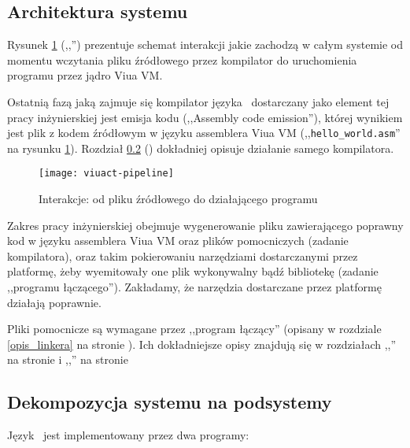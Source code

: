 \subsection{Architektura systemu}
\label{lang_architektura_systemu}

Rysunek \ref{schemat_interakcji_viuact_z_viuavm} (,,'') prezentuje
schemat interakcji jakie zachodzą w całym systemie od momentu wczytania pliku źródłowego przez kompilator do
uruchomienia programu przez jądro Viua VM.

Ostatnią fazą jaką zajmuje się kompilator języka \ViuAct\ dostarczany jako element tej pracy inżynierskiej jest
emisja kodu (,,Assembly code emission''), której wynikiem jest plik z kodem źródłowym w języku assemblera Viua
VM (,,\texttt{hello\_world.asm}'' na rysunku \ref{schemat_interakcji_viuact_z_viuavm}).
Rozdział \ref{architektura_kompilatora_viuact} () dokładniej opisuje
działanie samego kompilatora.

\begin{figure}[!htp]
    \centering
    \texttt{[image: viuact-pipeline]}
    \caption{Interakcje: od pliku źródłowego do działającego programu}
    \label{schemat_interakcji_viuact_z_viuavm}
\end{figure}

Zakres pracy inżynierskiej obejmuje wygenerowanie pliku zawierającego poprawny kod w języku
assemblera Viua VM oraz plików pomocniczych (zadanie kompilatora), oraz takim pokierowaniu
narzędziami dostarczanymi przez platformę, żeby wyemitowały one plik wykonywalny bądź bibliotekę (zadanie
,,programu łączącego''). Zakładamy, że narzędzia dostarczane przez platformę działają poprawnie.

Pliki pomocnicze są wymagane przez ,,program łączący'' (opisany w rozdziale \ref{opis_linkera} na stronie
\pageref{opis_linkera}). Ich dokładniejsze opisy znajdują się w rozdziałach
,,'' na stronie \pageref{pliki_interfejsow_modulow} i
,,'' na stronie \pageref{pliki_zaleznosci_modulow}

\subsection{Dekompozycja systemu na podsystemy}
\label{architektura_kompilatora_viuact}

Język \ViuAct\ jest implementowany przez dwa programy:

